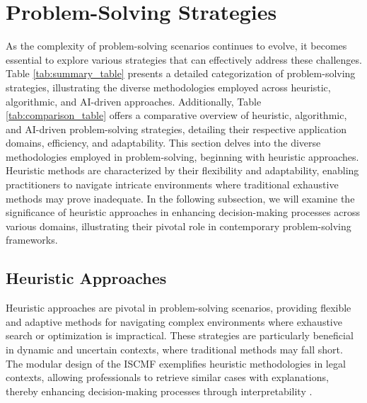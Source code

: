 \section{Problem-Solving Strategies} \label{sec:Problem-Solving Strategies}



As the complexity of problem-solving scenarios continues to evolve, it becomes essential to explore various strategies that can effectively address these challenges. Table \ref{tab:summary_table} presents a detailed categorization of problem-solving strategies, illustrating the diverse methodologies employed across heuristic, algorithmic, and AI-driven approaches. Additionally, Table \ref{tab:comparison_table} offers a comparative overview of heuristic, algorithmic, and AI-driven problem-solving strategies, detailing their respective application domains, efficiency, and adaptability. This section delves into the diverse methodologies employed in problem-solving, beginning with heuristic approaches. Heuristic methods are characterized by their flexibility and adaptability, enabling practitioners to navigate intricate environments where traditional exhaustive methods may prove inadequate. In the following subsection, we will examine the significance of heuristic approaches in enhancing decision-making processes across various domains, illustrating their pivotal role in contemporary problem-solving frameworks.









\subsection{Heuristic Approaches} \label{subsec:Heuristic Approaches}



Heuristic approaches are pivotal in problem-solving scenarios, providing flexible and adaptive methods for navigating complex environments where exhaustive search or optimization is impractical. These strategies are particularly beneficial in dynamic and uncertain contexts, where traditional methods may fall short. The modular design of the ISCMF exemplifies heuristic methodologies in legal contexts, allowing professionals to retrieve similar cases with explanations, thereby enhancing decision-making processes through interpretability \cite{lin2023interpretabilityframeworksimilarcase}.

